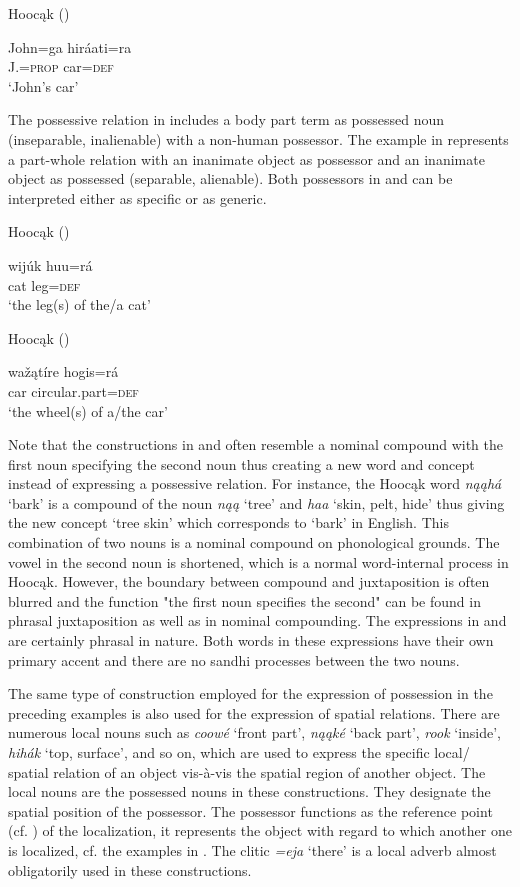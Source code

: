 \documentclass[output=paper]{LSP/langsci}
\begin{document}
\ea Hoocąk (\citealt[13]{Helmbrecht2003}) \label{johnscar}

\gll John=ga      hiráati=ra \\
J.=\textsc{prop} car=\textsc{def} \\
\glt `John's car'
\z

The possessive relation in  includes a body part term as possessed noun (inseparable, inalienable) with a non-human possessor. The example in  represents a part-whole relation with an inanimate object as possessor and an inanimate object as possessed (separable, alienable). Both possessors in  and  can be interpreted either as specific or as generic. 

\ea Hoocąk (\citealt[13]{Helmbrecht2003}) \label{leg}

\gll wijúk huu=rá \\
cat      leg=\textsc{def} \\
\glt `the leg(s) of the/a cat'
\z

\ea Hooc\k{a}k (\citealt[13]{Helmbrecht2003}) \label{wheel}

\gll waž\k{a}tíre hogis=rá \\
car  circular.part=\textsc{def} \\
\glt `the wheel(s) of a/the car'
\z

Note that the constructions in  and  often resemble a nominal compound with the first noun specifying the second noun thus creating a new word and concept instead of expressing a possessive relation. For instance, the Hoocąk word \textit{n\k{a}\k{a}h\'a} `bark' is a compound of the noun \textit{n\k{a}\k{a}} `tree' and \textit{haa} `skin, pelt, hide' thus giving the new concept `tree skin' which corresponds to `bark' in English. This combination of two nouns is a nominal compound on phonological grounds. The vowel in the second noun is shortened, which is a normal word-internal process in Hoocąk. However, the boundary between compound and juxtaposition is often blurred and the function "the first noun specifies the second" can be found in phrasal juxtaposition as well as in nominal compounding. The expressions in  and  are certainly phrasal in nature. Both words in these expressions have their own primary accent and there are no sandhi processes between the two nouns. 

The same type of construction employed for the expression of possession in the preceding examples is also used for the expression of spatial relations. There are numerous local nouns such as \textit{coow\'e}  `front part', \textit{n\k{a}\k{a}k\'e} `back part', \textit{rook} `inside', \textit{hihák} `top, surface', and so on, which are used to express the specific local/ spatial relation of an object vis-à-vis the spatial region of another object. The local nouns are the possessed nouns in these constructions. They designate the spatial position of the possessor. The possessor functions as the reference point (cf. \citealt{Langacker1993}) of the localization, it represents the object with regard to which another one is localized, cf. the examples in . The clitic \textit{=eja} `there' is a local adverb almost obligatorily used in these constructions. 
 
\end{document}

